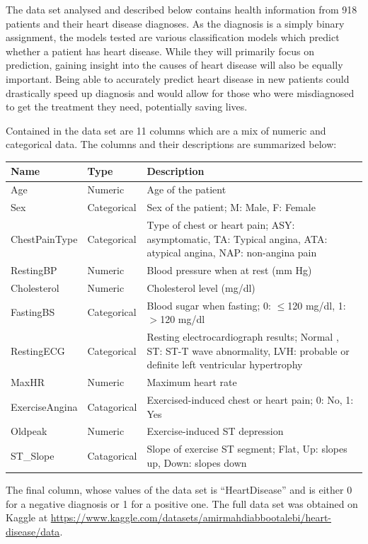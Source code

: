 \documentclass[12pt]{article}
\begin{document}
The data set analysed and described below contains health information from 918 
patients and their heart disease diagnoses. As the diagnosis is a simply binary 
assignment, the models tested are various classification models which predict 
whether a patient has heart disease. While they will primarily focus on prediction, 
gaining insight into the causes of heart disease will also be equally important. 
Being able to accurately predict heart disease in new patients could drastically 
speed up diagnosis and would allow for those who were misdiagnosed to get the 
treatment they need, potentially saving lives. 

Contained in the data set are 11 columns which are a mix of numeric and categorical 
data. The columns and their descriptions are summarized below:
\begin{center}
    \begin{tabular}{l l p{4.5in}}
        \toprule
        Name & Type & Description \\
        \midrule
        Age & Numeric & Age of the patient \\
        Sex & Categorical & Sex of the patient; M: Male, F: Female \\
        ChestPainType & Categorical & Type of chest or heart pain; ASY: asymptomatic, TA: Typical angina, ATA: atypical angina, NAP: non-angina pain \\
        RestingBP & Numeric & Blood pressure when at rest (mm Hg) \\
        Cholesterol & Numeric & Cholesterol level (mg/dl) \\
        FastingBS & Categorical & Blood sugar when fasting; 0: $\leq$120 mg/dl, 1: $>$120 mg/dl \\
        RestingECG & Categorical & Resting electrocardiograph results; Normal , ST: ST-T wave abnormality, LVH: probable or definite left ventricular hypertrophy \\
        MaxHR & Numeric & Maximum heart rate \\
        ExerciseAngina & Catagorical & Exercised-induced chest or heart pain; 0: No, 1: Yes \\
        Oldpeak & Numeric & Exercise-induced ST depression \\
        ST\_Slope & Catagorical & Slope of exercise ST segment; Flat, Up: slopes up, Down: slopes down \\
        \bottomrule
    \end{tabular}    
\end{center}    
The final column, whose values  of the data set is ``HeartDisease'' and is either 0 for a 
negative diagnosis or 1 for a positive one. The full data set was obtained on Kaggle at 
\url{https://www.kaggle.com/datasets/amirmahdiabbootalebi/heart-disease/data}.
\end{document}
